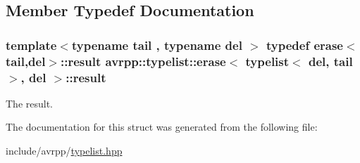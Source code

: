 \subsection{Member Typedef Documentation}
\hypertarget{structavrpp_1_1typelist_1_1erase_3_01typelist_3_01del_00_01tail_01_4_00_01del_01_4_addfd6335aa463ccd864c9df63d2d0526}{
\subsubsection[{result}]{\setlength{\rightskip}{0pt plus 5cm}template$<$typename tail , typename del $>$ typedef {\bf erase}$<$tail,del$>$::{\bf result} {\bf avrpp::typelist::erase}$<$ {\bf typelist}$<$ del, tail $>$, del $>$::{\bf result}}}
\label{structavrpp_1_1typelist_1_1erase_3_01typelist_3_01del_00_01tail_01_4_00_01del_01_4_addfd6335aa463ccd864c9df63d2d0526}


The result. 



The documentation for this struct was generated from the following file:\begin{DoxyCompactItemize}
\item 
include/avrpp/\hyperlink{typelist_8hpp}{typelist.hpp}\end{DoxyCompactItemize}
